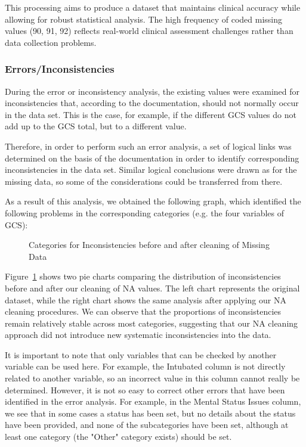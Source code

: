 \documentclass[10pt,letterpaper]{article}
\begin{document}
This processing aims to produce a dataset that maintains clinical accuracy while allowing for robust statistical analysis. The high frequency of coded missing values (90, 91, 92) reflects real-world clinical assessment challenges rather than data collection problems.

\subsubsection{Errors/Inconsistencies}

During the error or inconsistency analysis, the existing values were examined for inconsistencies that, according to the documentation, should not normally occur in the data set. This is the case, for example, if the different GCS values do not add up to the GCS total, but to a different value.

Therefore, in order to perform such an error analysis, a set of logical links was determined on the basis of the documentation in order to identify corresponding inconsistencies in the data set. Similar logical conclusions were drawn as for the missing data, so some of the considerations could be transferred from there. 

As a result of this analysis, we obtained the following graph, which identified the following problems in the corresponding categories (e.g. the four variables of GCS):

\begin{figure}[H]
    \centering
    \caption{Categories for Inconsistencies before and after cleaning of Missing Data}
    \label{fig:incsonsistencies}
\end{figure}

Figure~\ref{fig:incsonsistencies} shows two pie charts comparing the distribution of inconsistencies before and after our cleaning of NA values. The left chart represents the original dataset, while the right chart shows the same analysis after applying our NA cleaning procedures. We can observe that the proportions of inconsistencies remain relatively stable across most categories, suggesting that our NA cleaning approach did not introduce new systematic inconsistencies into the data.

It is important to note that only variables that can be checked by another variable can be used here. For example, the Intubated column is not directly related to another variable, so an incorrect value in this column cannot really be determined. However, it is not so easy to correct other errors that have been identified in the error analysis. For example, in the Mental Status Issues column, we see that in some cases a status has been set, but no details about the status have been provided, and none of the subcategories have been set, although at least one category (the "Other" category exists) should be set.
\end{document}
